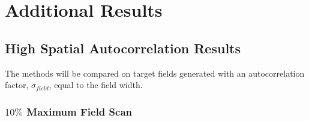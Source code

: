 \chapter{Additional Results}
\section{High Spatial Autocorrelation Results}
The methods will be compared on target fields generated with an autocorrelation factor, $\sigma_{field}$, equal to the field width.

\clearpage
\subsection{$10\%$ Maximum Field Scan}
